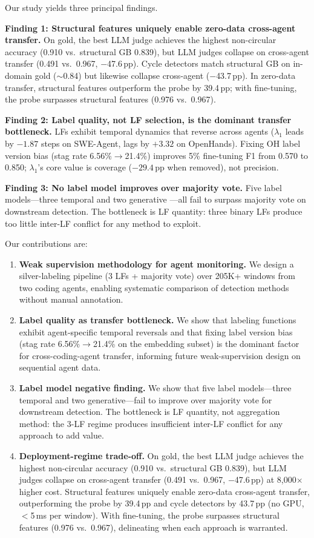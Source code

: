 Our study yields three principal findings.

\textbf{Finding 1: Structural features uniquely enable zero-data cross-agent transfer.}
On gold, the best LLM judge achieves the highest non-circular accuracy (0.910 vs.\ structural GB 0.839), but LLM judges collapse on cross-agent transfer (0.491 vs.\ 0.967, $-$47.6\,pp).
Cycle detectors match structural GB on in-domain gold (${\sim}$0.84) but likewise collapse cross-agent ($-$43.7\,pp).
In zero-data transfer, structural features outperform the probe by 39.4\,pp; with fine-tuning, the probe surpasses structural features (0.976 vs.\ 0.967).

\textbf{Finding 2: Label quality, not LF selection, is the dominant transfer bottleneck.}
LFs exhibit temporal dynamics that reverse across agents ($\lambda_1$ leads by $-1.87$ steps on SWE-Agent, lags by $+3.32$ on OpenHands).
Fixing OH label version bias (stag rate 6.56\%$\to$21.4\%) improves 5\% fine-tuning F1 from 0.570 to 0.850; $\lambda_1$'s core value is coverage ($-29.4$\,pp when removed), not precision.

\textbf{Finding 3: No label model improves over majority vote.}
Five label models---three temporal and two generative \citep{safranchik2020linkedhmm,fu2020flyingsquid,ratner2019snorkelmetal}---all fail to surpass majority vote on downstream detection.
The bottleneck is LF quantity: three binary LFs produce too little inter-LF conflict for any method to exploit.

Our contributions are:
\begin{enumerate}
    \item \textbf{Weak supervision methodology for agent monitoring.} We design a silver-labeling pipeline (3 LFs + majority vote) over 205K+ windows from two coding agents, enabling systematic comparison of detection methods without manual annotation.
    \item \textbf{Label quality as transfer bottleneck.} We show that labeling functions exhibit agent-specific temporal reversals and that fixing label version bias (stag rate 6.56\%$\to$21.4\% on the embedding subset) is the dominant factor for cross-coding-agent transfer, informing future weak-supervision design on sequential agent data.
    \item \textbf{Label model negative finding.} We show that five label models---three temporal and two generative---fail to improve over majority vote for downstream detection. The bottleneck is LF quantity, not aggregation method: the 3-LF regime produces insufficient inter-LF conflict for any approach to add value.
    \item \textbf{Deployment-regime trade-off.} On gold, the best LLM judge achieves the highest non-circular accuracy (0.910 vs.\ structural GB 0.839), but LLM judges collapse on cross-agent transfer (0.491 vs.\ 0.967, $-$47.6\,pp) at 8{,}000$\times$ higher cost. Structural features uniquely enable zero-data cross-agent transfer, outperforming the probe by 39.4\,pp and cycle detectors by 43.7\,pp (no GPU, ${<}$5\,ms per window). With fine-tuning, the probe surpasses structural features (0.976 vs.\ 0.967), delineating when each approach is warranted.
\end{enumerate}